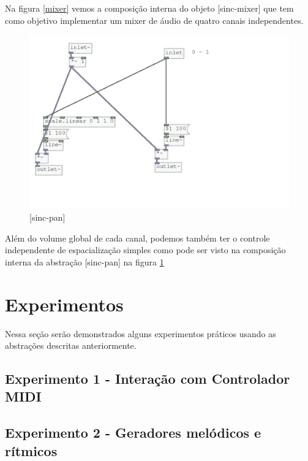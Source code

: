 \documentclass{ppgmus}
\begin{document}
Na figura \ref{mixer} vemos a composição interna do objeto
[sinc-mixer] que tem como objetivo implementar um mixer
de áudio de quatro canais independentes.

\begin{figure}[-h]
\includegraphics[scale=.4]{pan}
\caption{[sinc-pan]}
\label{pan}
\end{figure}

Além do volume global de cada canal, podemos também ter o controle
independente de espacialização simples como pode ser visto
na composição interna da abstração [sinc-pan] na figura \ref{pan}


\section {Experimentos}

Nessa seção serão demonstrados alguns experimentos práticos usando as abstrações
descritas anteriormente.

\subsection{Experimento 1 - Interação com Controlador MIDI}





\subsection{Experimento 2 - Geradores melódicos e rítmicos}
\end{document}
